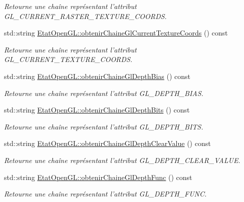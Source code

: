 \begin{DoxyCompactItemize}
\begin{DoxyCompactList}\small\item\em Retourne une chaîne représentant l'attribut G\-L\-\_\-\-C\-U\-R\-R\-E\-N\-T\-\_\-\-R\-A\-S\-T\-E\-R\-\_\-\-T\-E\-X\-T\-U\-R\-E\-\_\-\-C\-O\-O\-R\-D\-S. \end{DoxyCompactList}\item 
std\-::string \hyperlink{group__utilitaire_ga5bf6abadfe9d63e576d34c94c93ee8f0}{Etat\-Open\-G\-L\-::obtenir\-Chaine\-Gl\-Current\-Texture\-Coords} () const 
\begin{DoxyCompactList}\small\item\em Retourne une chaîne représentant l'attribut G\-L\-\_\-\-C\-U\-R\-R\-E\-N\-T\-\_\-\-T\-E\-X\-T\-U\-R\-E\-\_\-\-C\-O\-O\-R\-D\-S. \end{DoxyCompactList}\item 
std\-::string \hyperlink{group__utilitaire_gae3e587b7e9f860f3874823a3c4ab7d71}{Etat\-Open\-G\-L\-::obtenir\-Chaine\-Gl\-Depth\-Bias} () const 
\begin{DoxyCompactList}\small\item\em Retourne une chaîne représentant l'attribut G\-L\-\_\-\-D\-E\-P\-T\-H\-\_\-\-B\-I\-A\-S. \end{DoxyCompactList}\item 
std\-::string \hyperlink{group__utilitaire_gae1dffc44c8e27d7cb249064cfe35653e}{Etat\-Open\-G\-L\-::obtenir\-Chaine\-Gl\-Depth\-Bits} () const 
\begin{DoxyCompactList}\small\item\em Retourne une chaîne représentant l'attribut G\-L\-\_\-\-D\-E\-P\-T\-H\-\_\-\-B\-I\-T\-S. \end{DoxyCompactList}\item 
std\-::string \hyperlink{group__utilitaire_gad8b3e2701fb07b0178b5015868818509}{Etat\-Open\-G\-L\-::obtenir\-Chaine\-Gl\-Depth\-Clear\-Value} () const 
\begin{DoxyCompactList}\small\item\em Retourne une chaîne représentant l'attribut G\-L\-\_\-\-D\-E\-P\-T\-H\-\_\-\-C\-L\-E\-A\-R\-\_\-\-V\-A\-L\-U\-E. \end{DoxyCompactList}\item 
std\-::string \hyperlink{group__utilitaire_gac0dff9e4aee8f969fe6e688bb407dcc9}{Etat\-Open\-G\-L\-::obtenir\-Chaine\-Gl\-Depth\-Func} () const 
\begin{DoxyCompactList}\small\item\em Retourne une chaîne représentant l'attribut G\-L\-\_\-\-D\-E\-P\-T\-H\-\_\-\-F\-U\-N\-C. \end{DoxyCompactList}\item 

\end{DoxyCompactItemize}
